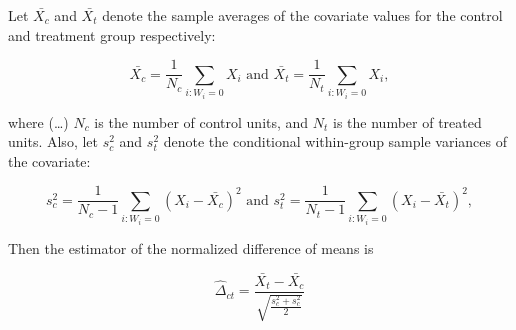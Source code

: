 \begin{displayquote}

Let $\bar{X_c}$ and $\bar{X_t}$ denote the sample averages of the covariate values for the control and treatment group respectively:

\begin{equation*}
  \bar{X_c}=\frac{1}{N_c} \sum_{i:W_i=0} X_i
  \text{  and  }
  \bar{X_t}=\frac{1}{N_t} \sum_{i:W_i=0} X_i,
\end{equation*}

where (\ldots) $N_c$ is the number of control units, and $N_t$ is the number of treated units. Also, let $s_c^2$ and $s_t^2$ denote the conditional within-group sample variances of the covariate:

\begin{equation*}
  s_c^2=\frac{1}{N_c-1} \sum_{i:W_i=0} (X_i-\bar{X_c})^2
  \text{  and  }
  s_t^2=\frac{1}{N_t-1} \sum_{i:W_i=0} (X_i-\bar{X_t})^2,
\end{equation*}

\end{displayquote}

Then the estimator of the normalized difference of means is

\begin{equation*}
  \hat{\Delta}_{ct}=
    \frac{\bar{X_t}-\bar{X_c}}
         {\sqrt{\frac{s_c^2+s_c^2}{2}}}
\end{equation*}


